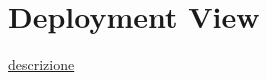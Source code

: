 \documentclass[../../../../dd.tex]{subfiles}
\begin{document}
	\section{Deployment View}
		\href{https://en.wikipedia.org/wiki/Deployment_diagram}{descrizione}
	
	
\end{document}
